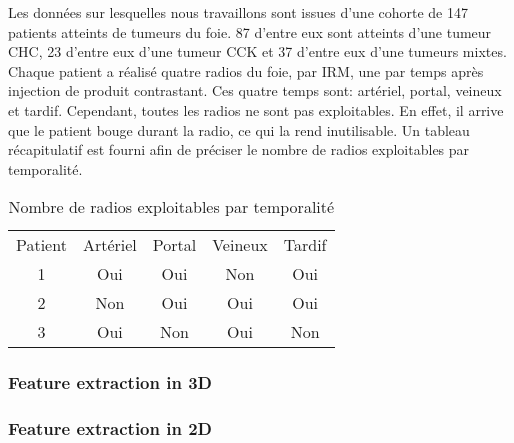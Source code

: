 \documentclass{article}
\begin{document}
Les données sur lesquelles nous travaillons sont issues d'une cohorte de 147 patients atteints de tumeurs du foie. 87 d'entre eux sont atteints d'une tumeur CHC, 23 d'entre eux d'une tumeur CCK et 37 d'entre eux d'une tumeurs mixtes. Chaque patient a réalisé quatre radios du foie, par IRM, une par temps après injection de produit contrastant. Ces quatre temps sont: artériel, portal, veineux et tardif. Cependant, toutes les radios ne sont pas exploitables. En effet, il arrive que le patient bouge durant la radio, ce qui la rend inutilisable. Un tableau récapitulatif est fourni afin de préciser le nombre de radios exploitables par temporalité.

\begin{table}[htbp]
    \centering
    \caption{Nombre de radios exploitables par temporalité}
    \label{tab:example}
    \begin{tabular}{ccccc}
        Patient & Artériel & Portal & Veineux & Tardif \\
        1 & Oui & Oui & Non & Oui \\
        2 & Non & Oui & Oui & Oui \\
        3 & Oui & Non & Oui & Non \\
    \end{tabular}
\end{table}

\subsubsection{Feature extraction in 3D}

\subsubsection{Feature extraction in 2D}
\end{document}
